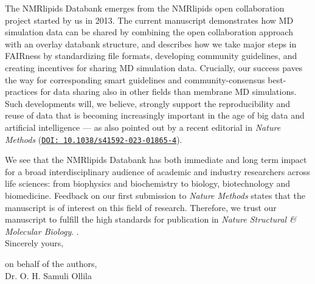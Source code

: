 \documentclass[11pt]{letter}
\begin{document}
The NMRlipids Databank emerges from the NMRlipids open collaboration project started by us in 2013.
The current manuscript demonstrates how MD simulation data can be shared by combining the open collaboration approach with an overlay databank structure, and describes how we take major steps in FAIRness by standardizing file formats, developing community guidelines, and creating incentives for sharing MD simulation data. Crucially, our success paves the way for corresponding smart guidelines and community-consensus best-practices for data sharing also in other fields than membrane MD simulations.
Such developments will, we believe, strongly support the reproducibility and reuse of data that is becoming increasingly important in the age of big data and artificial intelligence --- as also pointed out by a recent editorial in \textit{Nature Methods} (\href{https://doi.org/10.1038/s41592-023-01865-4}{\tt DOI: 10.1038/s41592-023-01865-4}). 

We see that the NMRlipids Databank has both immediate and long term impact for a broad interdisciplinary audience of academic and industry researchers across life sciences: from biophysics and biochemistry to biology, biotechnology and biomedicine. Feedback on our first submission to \textit{Nature Methods} states that the manuscript is of interest on this field of research. Therefore, we trust our manuscript to fulfill the high standards for publication in \textit{ Nature Structural \& Molecular Biology}.
.\\


Sincerely yours,

on behalf of the authors,\\

Dr. O. H. Samuli Ollila
\end{document}
